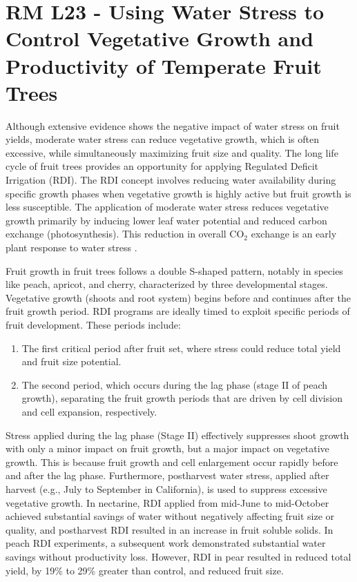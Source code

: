 \section{RM L23 - Using Water Stress to Control Vegetative Growth and Productivity of Temperate Fruit Trees}

Although extensive evidence shows the negative impact of water stress on fruit yields, moderate water stress can reduce vegetative growth, which is often excessive, while simultaneously maximizing fruit size and quality. The long life cycle of fruit trees provides an opportunity for applying Regulated Deficit Irrigation (RDI). The RDI concept involves reducing water availability during specific growth phases when vegetative growth is highly active but fruit growth is less susceptible. The application of moderate water stress reduces vegetative growth primarily by inducing lower leaf water potential and reduced carbon exchange (photosynthesis). This reduction in overall CO$_2$ exchange is an early plant response to water stress \cite*{rm_12_L23_water_stress_control_vegetative_growth_productivity}.

\vspace{0.5em}
Fruit growth in fruit trees follows a double S-shaped pattern, notably in species like peach, apricot, and cherry, characterized by three developmental stages. Vegetative growth (shoots and root system) begins before and continues after the fruit growth period. RDI programs are ideally timed to exploit specific periods of fruit development. These periods include: 

\begin{enumerate} 
    \item The first critical period after fruit set, where stress could reduce total yield and fruit size potential. 
    \item The second period, which occurs during the lag phase (stage II of peach growth), separating the fruit growth periods that are driven by cell division and cell expansion, respectively. 
\end{enumerate} 

\vspace{0.5em}
Stress applied during the lag phase (Stage II) effectively suppresses shoot growth with only a minor impact on fruit growth, but a major impact on vegetative growth. This is because fruit growth and cell enlargement occur rapidly before and after the lag phase. Furthermore, postharvest water stress, applied after harvest (e.g., July to September in California), is used to suppress excessive vegetative growth. In nectarine, RDI applied from mid-June to mid-October achieved substantial savings of water without negatively affecting fruit size or quality, and postharvest RDI resulted in an increase in fruit soluble solids. In peach RDI experiments, a subsequent work demonstrated substantial water savings without productivity loss. However, RDI in pear resulted in reduced total yield, by 19\% to 29\% greater than control, and reduced fruit size.


